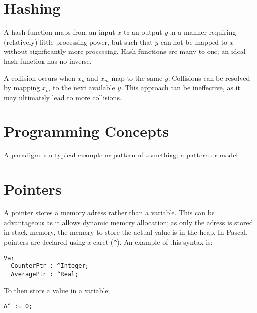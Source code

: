 \documentclass{article}
\begin{document}
\section{Hashing}

A hash function maps from an input $x$ to an output $y$ in a manner requiring
(relatively) little processing power, but such that $y$ can not be mapped to $x$
without significantly more processing. Hash functions are many-to-one; an ideal
hash function has no inverse. 

A collision occurs when $x_n$ and $x_m$ map to the same $y$. Collisions can be
resolved by mapping $x_m$ to the next available $y$. This approach can be
ineffective, as it may ultimately lead to more collisions.

\section{Programming Concepts}

A paradigm is a typical example or pattern of something; a pattern or model.

\section{Pointers}

A pointer stores a memory adress rather than a variable. This can be
advantageous as it allows dynamic memory allocation; as only the adress is
stored in stack memory, the memory to store the actual value is in the heap. In
Pascal, pointers are declared using a caret (\verb!^!). An example of this
syntax is: 

\begin{lstlisting}
Var
  CounterPtr : ^Integer;
  AveragePtr : ^Real;
\end{lstlisting} To then store a value in a variable;\begin{lstlisting}
A^ := 0;
\end{lstlisting}
\end{document}
